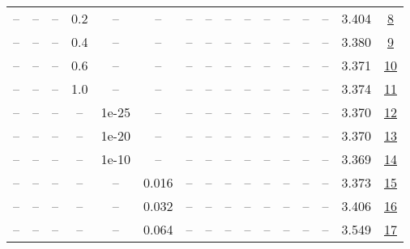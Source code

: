 \begin{table}[H]
\begin{tabular}{cccccccccccccccc}
-- & -- & -- & 0.2 & -- & -- & -- & -- & -- & -- & -- & -- & -- & -- & 3.404 & \href{https://wandb.ai/stanford-mercury/optimizer-scaling/runs/sweep-130m-5B-muonf6c5c2lr0.008-wd0.1-minlr0-warmup0-b10.8-b20.9-2406ea}{8} \\
-- & -- & -- & 0.4 & -- & -- & -- & -- & -- & -- & -- & -- & -- & -- & 3.380 & \href{https://wandb.ai/stanford-mercury/optimizer-scaling/runs/sweep-130m-5B-muon294f8alr0.008-wd0.1-minlr0-warmup0-b10.8-b20.9-d0f758}{9} \\
-- & -- & -- & 0.6 & -- & -- & -- & -- & -- & -- & -- & -- & -- & -- & 3.371 & \href{https://wandb.ai/stanford-mercury/optimizer-scaling/runs/sweep-130m-5B-muon27b9aelr0.008-wd0.1-minlr0-warmup0-b10.8-b20.9-f1ef5a}{10} \\
-- & -- & -- & 1.0 & -- & -- & -- & -- & -- & -- & -- & -- & -- & -- & 3.374 & \href{https://wandb.ai/stanford-mercury/optimizer-scaling/runs/sweep-130m-5B-muon322641lr0.008-wd0.1-minlr0-warmup0-b10.8-b20.9-3d0985}{11} \\
-- & -- & -- & -- & 1e-25 & -- & -- & -- & -- & -- & -- & -- & -- & -- & 3.370 & \href{https://wandb.ai/stanford-mercury/optimizer-scaling/runs/sweep-130m-5B-muonfadaa6lr0.008-wd0.1-minlr0-warmup0-b10.8-b20.9-c07478}{12} \\
-- & -- & -- & -- & 1e-20 & -- & -- & -- & -- & -- & -- & -- & -- & -- & 3.370 & \href{https://wandb.ai/stanford-mercury/optimizer-scaling/runs/sweep-130m-5B-muon3576f8lr0.008-wd0.1-minlr0-warmup0-b10.8-b20.9-741df0}{13} \\
-- & -- & -- & -- & 1e-10 & -- & -- & -- & -- & -- & -- & -- & -- & -- & 3.369 & \href{https://wandb.ai/stanford-mercury/optimizer-scaling/runs/sweep-130m-5B-muonf9afe0lr0.008-wd0.1-minlr0-warmup0-b10.8-b20.9-fce4b0}{14} \\
-- & -- & -- & -- & -- & 0.016 & -- & -- & -- & -- & -- & -- & -- & -- & 3.373 & \href{https://wandb.ai/stanford-mercury/optimizer-scaling/runs/sweep-130m-5B-muonf3214elr0.016-wd0.1-minlr0-warmup0-b10.8-b20.9-5d4d4f}{15} \\
-- & -- & -- & -- & -- & 0.032 & -- & -- & -- & -- & -- & -- & -- & -- & 3.406 & \href{https://wandb.ai/stanford-mercury/optimizer-scaling/runs/sweep-130m-5B-muon47b684lr0.032-wd0.1-minlr0-warmup0-b10.8-b20.9-9ff8e3}{16} \\
-- & -- & -- & -- & -- & 0.064 & -- & -- & -- & -- & -- & -- & -- & -- & 3.549 & \href{https://wandb.ai/stanford-mercury/optimizer-scaling/runs/sweep-130m-5B-muon8dfeeclr0.064-wd0.1-minlr0-warmup0-b10.8-b20.9-4639b6}{17} \\

\end{tabular}
\end{table}

